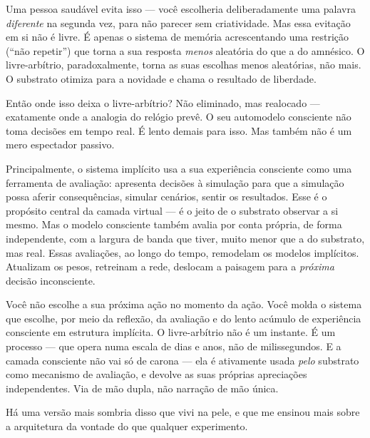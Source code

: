 \documentclass[11pt, twoside, openright]{book}
\begin{document}
Uma pessoa saudável evita isso --- você escolheria deliberadamente uma palavra \textit{diferente} na segunda vez, para não parecer sem criatividade. Mas essa evitação em si não é livre. É apenas o sistema de memória acrescentando uma restrição (``não repetir'') que torna a sua resposta \textit{menos} aleatória do que a do amnésico. O livre-arbítrio, paradoxalmente, torna as suas escolhas menos aleatórias, não mais. O substrato otimiza para a novidade e chama o resultado de liberdade.

Então onde isso deixa o livre-arbítrio? Não eliminado, mas realocado --- exatamente onde a analogia do relógio prevê. O seu automodelo consciente não toma decisões em tempo real. É lento demais para isso. Mas também não é um mero espectador passivo.

Principalmente, o sistema implícito usa a sua experiência consciente como uma ferramenta de avaliação: apresenta decisões à simulação para que a simulação possa aferir consequências, simular cenários, sentir os resultados. Esse é o propósito central da camada virtual --- é o jeito de o substrato observar a si mesmo. Mas o modelo consciente também avalia por conta própria, de forma independente, com a largura de banda que tiver, muito menor que a do substrato, mas real. Essas avaliações, ao longo do tempo, remodelam os modelos implícitos. Atualizam os pesos, retreinam a rede, deslocam a paisagem para a \textit{próxima} decisão inconsciente.

Você não escolhe a sua próxima ação no momento da ação. Você molda o sistema que escolhe, por meio da reflexão, da avaliação e do lento acúmulo de experiência consciente em estrutura implícita. O livre-arbítrio não é um instante. É um processo --- que opera numa escala de dias e anos, não de milissegundos. E a camada consciente não vai só de carona --- ela é ativamente usada \textit{pelo} substrato como mecanismo de avaliação, e devolve as suas próprias apreciações independentes. Via de mão dupla, não narração de mão única.

Há uma versão mais sombria disso que vivi na pele, e que me ensinou mais sobre a arquitetura da vontade do que qualquer experimento.
\end{document}
